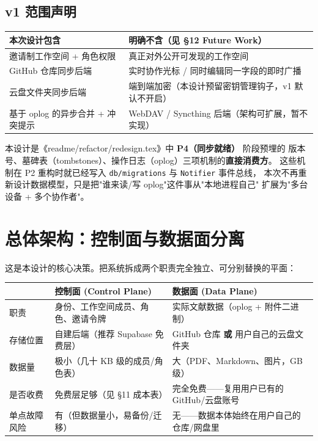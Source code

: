 \documentclass[12pt, a4paper]{article}
\begin{document}
\subsection{v1 范围声明}

\begin{center}
\begin{tabular}{p{6.5cm} p{6.5cm}}
  \toprule
  \textbf{本次设计包含} & \textbf{明确不含（见 \S 12 Future Work）} \\
  \midrule
  邀请制工作空间 + 角色权限     & 真正对外公开可发现的工作空间 \\
  GitHub 仓库同步后端           & 实时协作光标 / 同时编辑同一字段的即时广播 \\
  云盘文件夹同步后端             & 端到端加密（本设计预留密钥管理钩子，v1 默认不开启） \\
  基于 oplog 的异步合并 + 冲突提示 & WebDAV / Syncthing 后端（架构可扩展，暂不实现） \\
  \bottomrule
\end{tabular}
\end{center}

\begin{tcolorbox}[notebox, title={与现有重构路线图的关系}]
  本设计是《readme/refactor/redesign.tex》中 \textbf{P4（同步就绪）} 阶段预埋的
  版本号、墓碑表（tombstones）、操作日志（oplog）三项机制的\textbf{直接消费方}。
  这些机制在 P2 重构时就已经写入 \texttt{db/migrations} 与 \texttt{Notifier} 事件总线，
  本次不再重新设计数据模型，只是把"谁来读/写 oplog"这件事从"本地进程自己"
  扩展为"多台设备 + 多个协作者"。
\end{tcolorbox}

\section{总体架构：控制面与数据面分离}

这是本设计的核心决策。把系统拆成两个职责完全独立、可分别替换的平面：

\begin{center}
\begin{tabular}{p{3cm} p{4.6cm} p{4.6cm}}
  \toprule
  & \textbf{控制面 (Control Plane)} & \textbf{数据面 (Data Plane)} \\
  \midrule
  职责       & 身份、工作空间成员、角色、邀请令牌 & 实际文献数据（oplog + 附件二进制） \\
  存储位置   & 自建后端（推荐 Supabase 免费层） & GitHub 仓库 \textbf{或} 用户自己的云盘文件夹 \\
  数据量     & 极小（几十 KB 级的成员/角色表）  & 大（PDF、Markdown、图片，GB 级） \\
  是否收费   & 免费层足够（见 \S 11 成本表）    & 完全免费——复用用户已有的 GitHub/云盘账号 \\
  单点故障风险 & 有（但数据量小，易备份/迁移）    & 无——数据本体始终在用户自己的仓库/网盘里 \\
  \bottomrule
\end{tabular}
\end{center}
\end{document}
